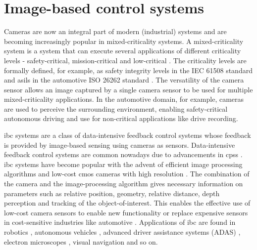 \section{Image-based control systems}
Cameras are now an integral part of modern (industrial) systems and are becoming increasingly popular in mixed-criticality systems.
A mixed-criticality system is a system that can execute several applications of different criticality levels - safety-critical, mission-critical and low-critical \cite{burns2013mixed}.
The criticality levels are formally defined, for example, as safety integrity levels in the IEC 61508 standard \cite{bell2006introduction} and \glspl{asil} in the automotive ISO 26262 standard \cite{jeon2011automotive}.
The versatility of the camera sensor allows an image captured by a single camera sensor to be used for multiple mixed-criticality applications.
In the automotive domain, for example, cameras are used to perceive the surrounding environment, enabling safety-critical autonomous driving and use for non-critical applications like drive recording.

\Gls{ibc} systems are a class of data-intensive feedback control systems whose feedback is provided by image-based sensing using cameras as sensors. 
Data-intensive feedback control systems are common nowadays due to advancements in \glspl{cps} \cite{van2018data}.
\Gls{ibc} systems have become popular with the advent of efficient image processing algorithms and low-cost \gls{cmos} cameras with high resolution \cite{corke2017robotics}. 
The combination of the camera and the image-processing algorithm gives necessary information on parameters such as relative position, geometry, relative distance, depth perception and tracking of the object-of-interest. 
This enables the effective use of low-cost camera sensors to enable new functionality or replace expensive sensors in cost-sensitive industries like automotive \cite{corke2017robotics,pendleton2017perception,saidi2018future}.
Applications of \gls{ibc} are found in robotics \cite{corke2017robotics}, autonomous vehicles \cite{elfring2016effective,pendleton2017perception}, advanced driver assistance systems (ADAS) \cite{bengler2014three}, electron microscopes \cite{FEI}, visual navigation \cite{chakraborty2016compensating} and so on.

